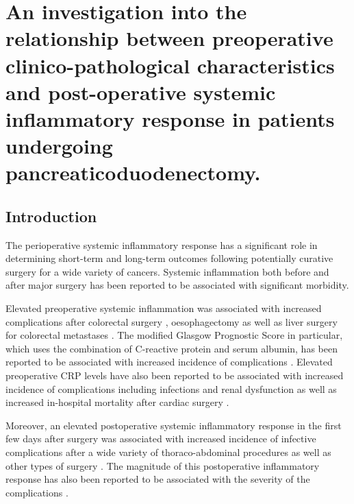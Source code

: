 
\chapter{An investigation into the relationship between preoperative clinico-pathological characteristics and post-operative systemic inflammatory response in patients undergoing pancreaticoduodenectomy.}
\label{ch_pre_post_sirs}

\clearpage


\section{Introduction}
The perioperative systemic inflammatory response has a significant role in determining short-term and long-term outcomes following potentially curative surgery for a wide variety of cancers. 
Systemic inflammation both before and after major surgery has been reported to be associated with significant morbidity. 

Elevated preoperative systemic inflammation was associated with increased complications after colorectal surgery \parencite{moyes_preoperative_2009, kubo_elevated_2013}, oesophagectomy \parencite{vashist_glasgow_2010} as well as liver surgery for colorectal metastases \parencite{neal_preoperative_2011}. 
The modified Glasgow Prognostic Score in particular, which uses the combination of C-reactive protein and serum albumin, has been reported to be associated with increased incidence of complications \parencite{moyes_preoperative_2009, mohri_correlation_2014, vashist_glasgow_2010}.
Elevated preoperative CRP levels have also been reported to be associated with increased incidence of complications including infections and renal dysfunction as well as increased in-hospital mortality after cardiac surgery \parencite{lorenzo_increased_2012, mezzomo_preoperative_2011, kim_predictive_2009, biancari_preoperative_2003, boeken_increased_1998}.

Moreover, an elevated postoperative systemic inflammatory response in the first few days after surgery was associated with increased incidence of infective complications after a wide variety of thoraco-abdominal procedures \parencite{singh_systematic_2014, platt_c-reactive_2012, dutta_persistent_2011, welsch_persisting_2008} as well as other types of surgery \parencite{mcneer_early_2010, laporta_baez_c-reactive_2011}.
The magnitude of this postoperative inflammatory response has also been reported to be associated with the severity of the complications \parencite{mcsorley_postoperative_2015}. 

